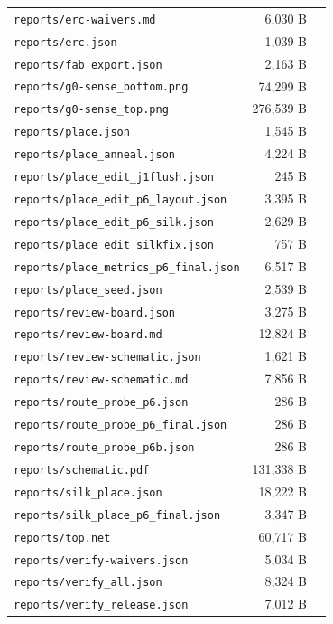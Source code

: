 \documentclass[11pt,a4paper]{article}
\begin{document}
{\begin{longtable}{p{9cm}rp{4cm}}
\texttt{reports/erc-waivers.md} & 6,030 B &  \\
\texttt{reports/erc.json} & 1,039 B &  \\
\texttt{reports/fab\_export.json} & 2,163 B &  \\
\texttt{reports/g0-sense\_bottom.png} & 74,299 B &  \\
\texttt{reports/g0-sense\_top.png} & 276,539 B &  \\
\texttt{reports/place.json} & 1,545 B &  \\
\texttt{reports/place\_anneal.json} & 4,224 B &  \\
\texttt{reports/place\_edit\_j1flush.json} & 245 B &  \\
\texttt{reports/place\_edit\_p6\_layout.json} & 3,395 B &  \\
\texttt{reports/place\_edit\_p6\_silk.json} & 2,629 B &  \\
\texttt{reports/place\_edit\_silkfix.json} & 757 B &  \\
\texttt{reports/place\_metrics\_p6\_final.json} & 6,517 B &  \\
\texttt{reports/place\_seed.json} & 2,539 B &  \\
\texttt{reports/review-board.json} & 3,275 B &  \\
\texttt{reports/review-board.md} & 12,824 B &  \\
\texttt{reports/review-schematic.json} & 1,621 B &  \\
\texttt{reports/review-schematic.md} & 7,856 B &  \\
\texttt{reports/route\_probe\_p6.json} & 286 B &  \\
\texttt{reports/route\_probe\_p6\_final.json} & 286 B &  \\
\texttt{reports/route\_probe\_p6b.json} & 286 B &  \\
\texttt{reports/schematic.pdf} & 131,338 B &  \\
\texttt{reports/silk\_place.json} & 18,222 B &  \\
\texttt{reports/silk\_place\_p6\_final.json} & 3,347 B &  \\
\texttt{reports/top.net} & 60,717 B &  \\
\texttt{reports/verify-waivers.json} & 5,034 B &  \\
\texttt{reports/verify\_all.json} & 8,324 B &  \\
\texttt{reports/verify\_release.json} & 7,012 B &  \\
\bottomrule
\end{longtable}
}
\end{document}
